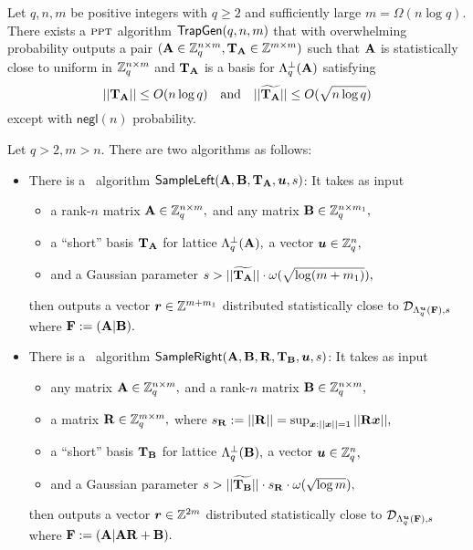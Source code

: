 \begin{lemma} \label{lem:trapgen}
Let $q, n, m$ be positive integers with $q\geq 2$ and sufficiently large $m = \Omega(n \log q)$. There exists a $\textsc{ppt}$ algorithm $\mathsf{TrapGen}(q, n, m)$ that with overwhelming probability outputs a pair $(\mathbf{A}\in\mathbb{Z}_q^{n\times m}, \mathbf{T}_{\mathbf{A}} \in\mathbb{Z}^{m\times m})$ such that $\mathbf{A}$ is statistically close to uniform in $\mathbb{Z}_q^{n\times m}$ and $\mathbf{T}_{\mathbf{A}}$ is a basis for $\Lambda_q^{\bot}(\mathbf{A})$ satisfying
$$||\mathbf{T}_{\mathbf{A}}||\leq O(n\log q)\quad\mbox{and}\quad||\widetilde{\mathbf{T}_{\mathbf{A}}}||\leq O(\sqrt{n\log q})$$
except with $\mathsf{negl}(n)$ probability.
\end{lemma}

\begin{lemma} \label{lem:samp}
Let $q>2, m>n.$ There are two algorithms as follows:
\begin{itemize}
 \item There is a \ppt\ algorithm $\mathsf{SampleLeft}(\mathbf{A}, \mathbf{B}, \mathbf{T}_{\mathbf{A}}, \boldsymbol{u}, s)$: It takes as input
\begin{itemize}
\item a rank-$n$ matrix $\mathbf{A}\in\mathbb{Z}_q^{n\times m},$ and any matrix $\mathbf{B}\in\mathbb{Z}_q^{n\times m_1},$
\item a ``short'' basis $\mathbf{T}_{\mathbf{A}}$ for lattice $\Lambda_q^{\bot}(\mathbf{A}),$ a vector $\boldsymbol{u}\in\mathbb{Z}_q^n,$
\item and a Gaussian parameter $s > ||\widetilde{\mathbf{T}_{\mathbf{A}}}||\cdot\omega(\sqrt{\log(m+m_1)}),$
\end{itemize}
then outputs a vector $\boldsymbol{r}\in\mathbb{Z}^{m+m_1}$ distributed statistically close to $\mathcal{D}_{\Lambda_q^{\boldsymbol{u}}(\mathbf{F}), s}$ where $\mathbf{F}:=(\mathbf{A}|\mathbf{B}).$

 \item There is a \ppt\ algorithm $\mathsf{SampleRight}(\mathbf{A}, \mathbf{B}, \mathbf{R}, \mathbf{T}_{\mathbf{B}}, \boldsymbol{u}, s)$: It takes as input
\begin{itemize}
\item any matrix $\mathbf{A}\in\mathbb{Z}_q^{n \times m},$ and a rank-$n$ matrix $\mathbf{B}\in\mathbb{Z}_q^{n\times m},$
\item a matrix $\mathbf{R}\in\mathbb{Z}_q^{m \times m},$ where $s_{\mathbf{R}} := ||\mathbf{R}|| = \sup_{\boldsymbol{x} : ||\boldsymbol{x}||=1}||\mathbf{R}\boldsymbol{x}||,$
\item a ``short'' basis $\mathbf{T}_{\mathbf{B}}$ for lattice $\Lambda_q^{\bot}(\mathbf{B}),$ a vector $\boldsymbol{u}\in\mathbb{Z}_q^n,$
\item and a Gaussian parameter $s > ||\widetilde{\mathbf{T}_{\mathbf{B}}}||\cdot{s_{\mathbf{R}}}\cdot\omega(\sqrt{\log{m}}),$
\end{itemize}
then outputs a vector $\boldsymbol{r}\in\mathbb{Z}^{2m}$ distributed statistically close to $\mathcal{D}_{\Lambda_q^{\boldsymbol{u}}(\mathbf{F}), s}$ where $\mathbf{F}:=(\mathbf{A}|\mathbf{A}\mathbf{R} + \mathbf{B}).$


\end{itemize}
\end{lemma}
